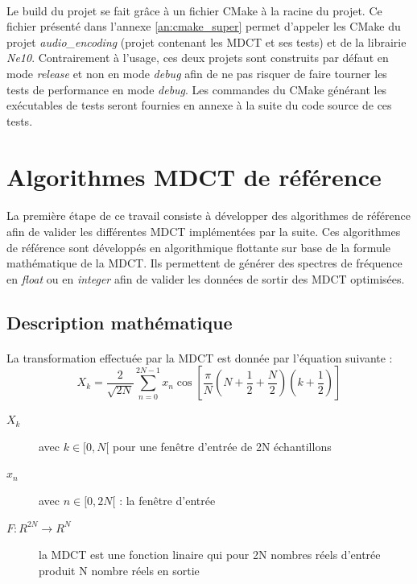\documentclass{article}
\begin{document}
    \paragraph{}
    Le build du projet se fait grâce à un fichier CMake à la racine du projet. Ce fichier présenté dans l'annexe \ref{an:cmake_super} permet d'appeler les CMake du projet \emph{audio\_encoding} (projet contenant les MDCT et ses tests) et de la librairie \emph{Ne10}. Contrairement à l'usage, ces deux projets sont construits par défaut en mode \emph{release} et non en mode \emph{debug} afin de ne pas risquer de faire tourner les tests de performance en mode \emph{debug}. Les commandes du CMake générant les exécutables de tests seront fournies en annexe à la suite du code source de ces tests.

    \newpage
    \section{Algorithmes MDCT de référence}
    \paragraph{}
    La première étape de ce travail consiste à développer des algorithmes de référence afin de valider les différentes MDCT implémentées par la suite. Ces algorithmes de référence sont développés en algorithmique flottante sur base de la formule mathématique de la MDCT. Ils permettent de générer des spectres de fréquence en \emph{float} ou en \emph{integer} afin de valider les données de sortir des MDCT optimisées.

    \subsection{Description mathématique}
    \label{sec:desc-math}
    \paragraph{}
    La transformation effectuée par la MDCT est donnée par l'équation suivante\cite{wiki:MDCT} :
    $$X_k = \frac{2}{\sqrt{2N}} \sum_{n=0}^{2N-1} x_n \cos \left[ \frac{\pi}{N} \left( N + \frac{1}{2} + \frac{N}{2} \right) \left( k + \frac{1}{2} \right) \right]$$
    \begin{description}
        \item[$X_k$] avec $k \in [0, N[$ pour une fenêtre d'entrée de 2N échantillons
        \item[$x_n$] avec $n \in [0, 2N[$ : la fenêtre d'entrée
        \item[$F: R^{2N} \rightarrow R^N$] la MDCT est une fonction linaire qui pour 2N nombres réels d'entrée produit N nombre réels en sortie
    \end{description}
\end{document}
